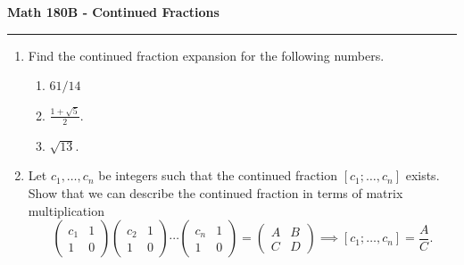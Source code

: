 \documentclass[11pt,letterpaper]{report}
\begin{document}
\begin{center}
{\bf \Large Math 180B - Continued Fractions}
\vspace{0.2cm}
\hrule
\end{center}

\begin{enumerate}
	\item Find the continued fraction expansion for the following numbers.
	\begin{enumerate}
		\item $61/14$
		\vfill
		\item $\frac{1+\sqrt{5}}{2}$.
		\vfill
		\item $\sqrt{13}$.
		\vfill
	\end{enumerate}

	\item Let $c_1, \ldots, c_n$ be integers such that the continued fraction $[c_1; \ldots, c_n]$ exists. Show that we can describe the continued fraction in terms of matrix multiplication
	\[
	\begin{pmatrix}
		c_1 & 1\\
		1 & 0
	\end{pmatrix}
	\begin{pmatrix}
		c_2 & 1\\
		1 & 0
	\end{pmatrix}\cdots
	\begin{pmatrix}
		c_n & 1\\
		1 & 0
	\end{pmatrix}=
	\begin{pmatrix}
		A & B\\
		C & D
	\end{pmatrix}\implies [c_1;\ldots, c_n] = \frac{A}{C}.
	\]
	\vfill
\end{enumerate}
\end{document}
